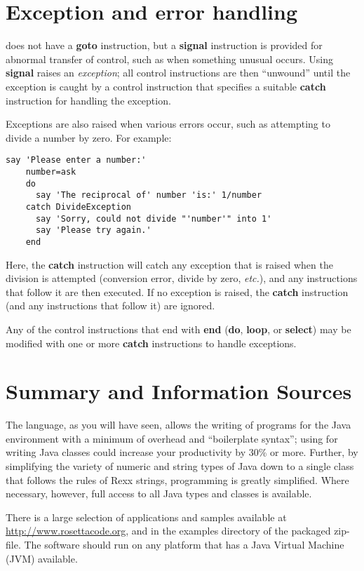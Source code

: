 \section{Exception and error handling}\label{exceptions}
\nr{} does not have a \textbf{goto} instruction, but a \textbf{signal} instruction is provided for abnormal transfer
of control, such as when something unusual occurs. Using \textbf{signal} raises an \emph{exception}; all control
instructions are then “unwound” until the exception is caught by a control instruction that specifies a suitable
\textbf{catch} instruction for handling the exception.

Exceptions are also raised when various errors occur, such as
attempting to divide a number by zero. For example:
\begin{lstlisting}[label=exception,caption=Exception]
    say 'Please enter a number:'
    number=ask
    do
      say 'The reciprocal of' number 'is:' 1/number
    catch DivideException
      say 'Sorry, could not divide "'number'" into 1'
      say 'Please try again.'
    end
\end{lstlisting}
Here, the \textbf{catch} instruction will catch any exception that is raised when the division is attempted (conversion error, divide by zero, \emph{etc.}), and any instructions that follow it are then executed. If no exception is raised, the \textbf{catch} instruction (and any instructions that follow it) are ignored.

Any of the control instructions that end with \textbf{end} (\textbf{do}, \textbf{loop}, or \textbf{select}) may be modified with one or more \textbf{catch} instructions to handle exceptions.

\section{Summary and Information Sources}
The \nr{} language, as you will have seen, allows the writing of programs for the Java environment with a minimum of overhead and “boilerplate syntax”; using \nr{} for writing Java classes could increase your productivity by 30\% or more.
Further, by simplifying the variety of numeric and string types of
Java down to a single class that follows the rules of Rexx strings,
programming is greatly simplified. Where necessary, however, full
access to all Java types and classes is available.

There is a large selection of applications and samples available at \url{http://www.rosettacode.org}, and
in the examples directory of the packaged \nr{} zip-file.
The software should run on any platform that has a Java Virtual
Machine (JVM) available.

